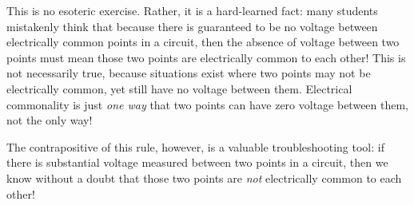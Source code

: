 This is no esoteric exercise.  Rather, it is a hard-learned fact: many students mistakenly think that because there is guaranteed to be no voltage between electrically common points in a circuit, then the absence of voltage between two points must mean those two points are electrically common to each other!  This is not necessarily true, because situations exist where two points may not be electrically common, yet still have no voltage between them.  Electrical commonality is just {\it one way} that two points can have zero voltage between them, not the only way!

The contrapositive of this rule, however, is a valuable troubleshooting tool: if there is substantial voltage measured between two points in a circuit, then we know without a doubt that those two points are {\it not} electrically common to each other!





